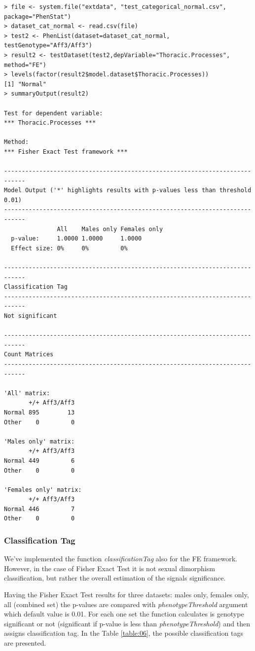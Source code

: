 \documentclass[12pt,a4paper]{article}
\begin{document}
\begingroup
    \fontsize{8pt}{12pt}\selectfont
\begin{verbatim}
> file <- system.file("extdata", "test_categorical_normal.csv", package="PhenStat") 
> dataset_cat_normal <- read.csv(file)
> test2 <- PhenList(dataset=dataset_cat_normal, testGenotype="Aff3/Aff3")
> result2 <- testDataset(test2,depVariable="Thoracic.Processes", method="FE")
> levels(factor(result2$model.dataset$Thoracic.Processes))
[1] "Normal"
> summaryOutput(result2)

Test for dependent variable:
*** Thoracic.Processes ***

Method:
*** Fisher Exact Test framework ***

----------------------------------------------------------------------------
Model Output ('*' highlights results with p-values less than threshold 0.01)
----------------------------------------------------------------------------
               All    Males only Females only
  p-value:     1.0000 1.0000     1.0000      
  Effect size: 0%     0%         0%          

----------------------------------------------------------------------------
Classification Tag
----------------------------------------------------------------------------
Not significant

----------------------------------------------------------------------------
Count Matrices
----------------------------------------------------------------------------

'All' matrix:
       +/+ Aff3/Aff3
Normal 895        13
Other    0         0

'Males only' matrix:
       +/+ Aff3/Aff3
Normal 449         6
Other    0         0

'Females only' matrix:
       +/+ Aff3/Aff3
Normal 446         7
Other    0         0
\end{verbatim}
\endgroup
\subsubsection{Classification Tag}
We've implemented the function \textit{classificationTag} also for the FE framework. 
However, in the case of Fisher Exact Test it is not sexual dimorphism classification, but rather the overall estimation of the signals significance.

Having the Fisher Exact Test results for three datasets: males only, females only, all (combined set) the p-values are compared with \textit{phenotypeThreshold} argument which default value is 0.01. For each one set the function calculates is genotype significant or not (significant if p-value is less than \textit{phenotypeThreshold}) and then assigns classification tag. In the Table \ref{table:06}, the possible classification tags are presented.  
\end{document}
